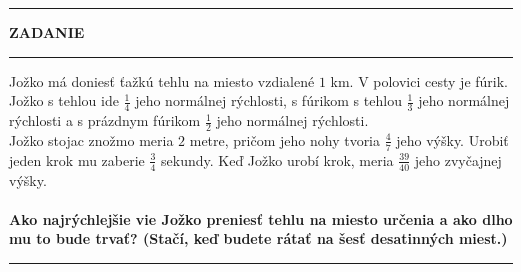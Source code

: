 \documentclass{article}
\begin{document}
\hrule
\medskip
\begin{center}
\textbf{\huge ZADANIE}
\end{center}
\medskip
\hrule
\medskip
\large
Jožko má doniesť ťažkú tehlu na miesto vzdialené $1$ km. 
V polovici cesty je fúrik.
Jožko s tehlou ide $\frac{1}{4}$ jeho normálnej rýchlosti, s fúrikom s tehlou $\frac{1}{3}$ jeho normálnej rýchlosti a s prázdnym fúrikom $\frac{1}{2}$ jeho normálnej rýchlosti.\\
Jožko stojac znožmo meria $2$ metre, pričom jeho nohy tvoria $\frac{4}{7}$ jeho výšky.
Urobiť jeden krok mu zaberie $\frac{3}{4}$ sekundy.
Keď Jožko urobí krok, meria $\frac{39}{40}$ jeho zvyčajnej výšky.\\
\medskip
\\
\textbf{Ako najrýchlejšie vie Jožko preniesť tehlu na miesto určenia a ako dlho mu to bude trvať? (Stačí, keď budete rátať na šesť desatinných miest.)}
\medskip
\hrule
\end{document}
